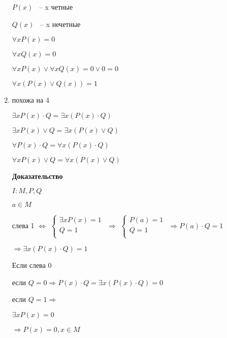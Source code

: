 \documentclass[russian]{lecture-notes}
\begin{document}
\begin{enumerate}
{\begin{remark}
                $P(x)$ ~-- x четные

                $Q(x)$ ~-- x нечетные

                $\forall x P(x) = 0$

                $\forall x Q(x) = 0$

                $\forall x P(x) \lor \forall x Q(x) = 0 \lor 0 = 0$

                $\forall x (P(x) \lor Q(x)) = 1$
            \end{remark}

        }

        \item{
            похожа на 4

            $\exists x P(x) \cdot Q = \exists x (P(x) \cdot Q)$

            $\exists x P(x) \lor Q = \exists x (P(x) \lor Q)$

            $\forall P(x) \cdot Q = \forall x (P(x) \cdot Q)$

            $\forall x P(x) \lor Q = \forall x (P(x) \lor Q)$

            \textbf{Доказательство}

            $I: M, P, Q$

            $a \in M$

            слева 1 $\Leftrightarrow$
            $\left \{
            \begin{gathered}
                \exists x P(x) = 1 \\
                Q = 1 \\
            \end{gathered}
            \right.$
            $\Rightarrow$
            $\left \{
            \begin{gathered}
                P(a) = 1 \\
                Q = 1 \\
            \end{gathered}
            \right.$
            $\Rightarrow P(a) \cdot Q = 1$

            $\Rightarrow \exists x (P(x) \cdot Q) = 1$

            Если слева 0

            если $Q = 0 \Rightarrow P(x) \cdot Q = \exists x (P(x) \cdot Q) = 0$

            если $Q = 1 \Rightarrow$

            $\exists x P(x) = 0 $

            $\Rightarrow P(x) = 0, x \in M$

}
\end{enumerate}
\end{document}
